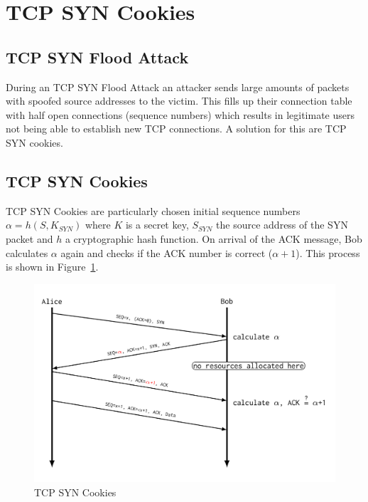 
\section{TCP SYN Cookies}

\subsection{TCP SYN Flood Attack}
During an TCP SYN Flood Attack an attacker sends large amounts of packets with spoofed source addresses to the victim.
This fills up their connection table with half open connections (sequence numbers) which results in legitimate users not being able to establish new TCP connections.
A solution for this are TCP SYN cookies.

\subsection{TCP SYN Cookies}
TCP SYN Cookies are particularly chosen initial sequence numbers $\alpha = h(S,K_{SYN})$ where $K$ is a secret key, $S_{SYN}$ the source address of the SYN packet and $h$ a cryptographic hash function.
On arrival of the ACK message, Bob calculates $\alpha$ again and checks if the ACK number is correct ($\alpha + 1$).
This process is shown in Figure~\ref{fig:tcp_syn_cookies}.
\begin{figure}[h]
  \centering
  \includegraphics[width=.6\textwidth]{figures/tcp_syn_cookies.png}
  \caption{TCP SYN Cookies}\label{fig:tcp_syn_cookies}
\end{figure}

